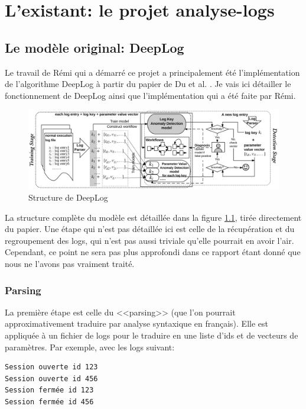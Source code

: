 \documentclass[openany, 11pt]{memoir}
\begin{document}
\newpage
\chapter{L'existant: le projet analyse-logs}

\section{Le modèle original: DeepLog}
\label{sectiondeeplog}

Le travail de Rémi qui a démarré ce projet a principalement été l'implémentation de l'algorithme DeepLog à partir du papier de Du et al. \cite{deeplog}. Je vais ici détailler le fonctionnement de DeepLog ainsi que l'implémentation qui a été faite par Rémi.

\begin{figure}[ht]
	\centering
	\includegraphics[width=\textwidth]{images/deeplog.png}
	\caption{Structure de DeepLog}
	\label{deeplog}
\end{figure}

La structure complète du modèle est détaillée dans la figure \ref{deeplog}, tirée directement du papier. Une étape qui n'est pas détaillée ici est celle de la récupération et du regroupement des \glspl{log}, qui n'est pas aussi triviale qu'elle pourrait en avoir l'air. Cependant, ce point ne sera pas plus approfondi dans ce rapport étant donné que nous ne l'avons pas vraiment traité.

\subsection{Parsing}

La première étape est celle du <<parsing>> (que l'on pourrait approximativement traduire par analyse syntaxique en français). Elle est appliquée à un fichier de \glspl{log} pour le traduire en une liste d'ids et de vecteurs de paramètres. Par exemple, avec les logs suivant:

\begin{lstlisting}
Session ouverte id 123
Session ouverte id 456
Session fermée id 123
Session fermée id 456
\end{lstlisting}
\end{document}
